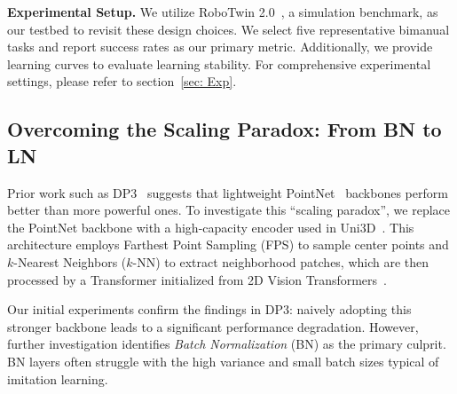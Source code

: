 \documentclass[runningheads]{llncs}
\begin{document}
\noindent\textbf{Experimental Setup.}
We utilize RoboTwin 2.0~\cite{chen2025robotwin}, a simulation benchmark, as our testbed to revisit these design choices. We select five representative bimanual tasks and report success rates as our primary metric. Additionally, we provide learning curves to evaluate learning stability. For comprehensive experimental settings, please refer to section~\ref{sec: Exp}.

\subsection{Overcoming the Scaling Paradox: From BN to LN}
Prior work such as DP3~\cite{ze20243d} suggests that lightweight PointNet~\cite{qi2017pointnet} backbones perform better than more powerful ones. To investigate this ``scaling paradox'', we replace the PointNet backbone with a high-capacity encoder used in Uni3D~\cite{zhou2023uni3d}. This architecture employs Farthest Point Sampling (FPS) to sample center points and $k$-Nearest Neighbors ($k$-NN) to extract neighborhood patches, which are then processed by a Transformer initialized from 2D Vision Transformers~\cite{dosovitskiy2020image}.

Our initial experiments confirm the findings in DP3: naively adopting this stronger backbone leads to a significant performance degradation. However, further investigation identifies \emph{Batch Normalization} (BN) as the primary culprit. BN layers often struggle with the high variance and small batch sizes typical of imitation learning. 
\end{document}
